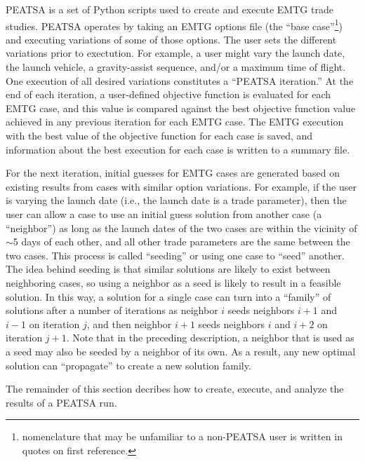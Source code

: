 
\ac{PEATSA} is a set of Python scripts used to create and execute \ac{EMTG} trade studies. \ac{PEATSA} operates by taking an \ac{EMTG} options file (the ``base case''\footnote{nomenclature that may be unfamiliar to a non-\ac{PEATSA} user is written in quotes on first reference.}) and executing variations of some of those options. The user sets the different variations prior to exectution. For example, a user might vary the launch date, the launch vehicle, a gravity-assist sequence, and/or a maximum time of flight. One execution of all desired variations constitutes a ``\ac{PEATSA} iteration.'' At the end of each iteration, a user-defined objective function is evaluated for each \ac{EMTG} case, and this value is compared against the best objective function value achieved in any previous iteration for each \ac{EMTG} case. The \ac{EMTG} execution with the best value of the objective function for each case is saved, and information about the best execution for each case is written to a summary file.

\noindent For the next iteration, initial guesses for \ac{EMTG} cases are generated based on existing results from cases with similar option variations. For example, if the user is varying the launch date (i.e., the launch date is a trade parameter), then the user can allow a case to use an initial guess solution from another case (a ``neighbor'') as long as the launch dates of the two cases are within the vicinity of  \(\sim \)5 days of each other, and all other trade parameters are the same between the two cases. This process is called ``seeding'' or using one case to ``seed'' another. The idea behind seeding is that similar solutions are likely to exist between neighboring cases, so using a neighbor as a seed is likely to result in a feasible solution. In this way, a solution for a single case can turn into a ``family'' of solutions after a number of iterations as neighbor $i$ seeds neighbors $i+1$ and $i-1$ on iteration $j$, and then neighbor $i+1$ seeds neighbors $i$ and $i+2$ on iteration $j+1$. Note that in the preceding description, a neighbor that is used as a seed may also be seeded by a neighbor of its own. As a result, any new optimal solution can ``propagate'' to create a new solution family.

\noindent The remainder of this section decribes how to create, execute, and analyze the results of a \ac{PEATSA} run.